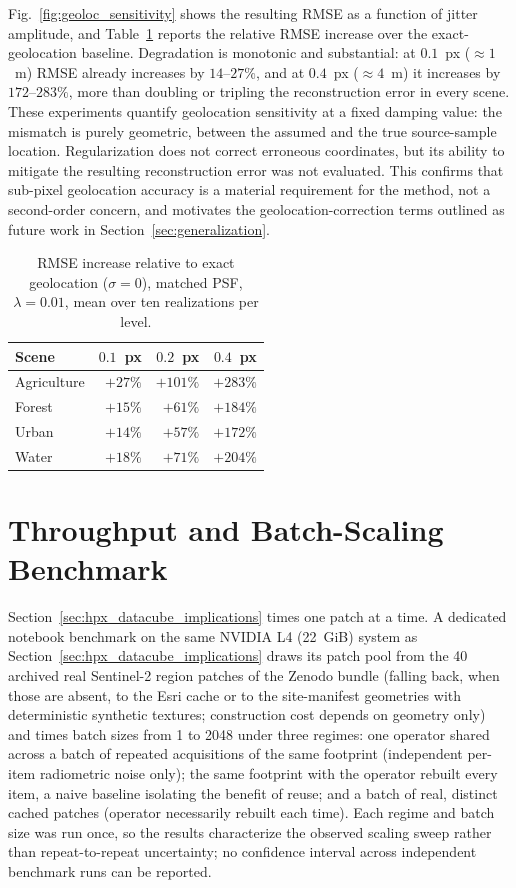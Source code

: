 \documentclass[journal]{IEEEtran}
\newcommand{\psf}{PSF\xspace}
\begin{document}
Fig.~\ref{fig:geoloc_sensitivity} shows the resulting RMSE as a
function of jitter amplitude, and
Table~\ref{tab:geoloc_sensitivity} reports the relative RMSE
increase over the exact-geolocation baseline. Degradation is
monotonic and substantial: at $0.1$~px ($\approx1$~m) RMSE already
increases by $14$--$27\%$, and at $0.4$~px ($\approx4$~m) it
increases by $172$--$283\%$, more than doubling or tripling the
reconstruction error in every scene. These experiments quantify geolocation
sensitivity at a fixed damping value: the mismatch is purely
geometric, between the assumed and the true source-sample
location. Regularization does not correct erroneous coordinates,
but its ability to mitigate the resulting reconstruction error was
not evaluated. This confirms that sub-pixel geolocation accuracy is a
material requirement for the method, not a second-order concern,
and motivates the geolocation-correction terms outlined as future
work in Section~\ref{sec:generalization}.

\begin{table}[t]
\centering
\caption{RMSE increase relative to exact geolocation ($\sigma=0$),
matched \psf, $\lambda=0.01$, mean over ten realizations per level.}
\label{tab:geoloc_sensitivity}
\begin{tabular}{lrrr}
\toprule
Scene & $0.1$~px & $0.2$~px & $0.4$~px \\
\midrule
Agriculture & $+27\%$ & $+101\%$ & $+283\%$ \\
Forest      & $+15\%$ & $+61\%$  & $+184\%$ \\
Urban       & $+14\%$ & $+57\%$  & $+172\%$ \\
Water       & $+18\%$ & $+71\%$  & $+204\%$ \\
\bottomrule
\end{tabular}
\end{table}

\section{Throughput and Batch-Scaling Benchmark}
\label{app:throughput_scaling}

Section~\ref{sec:hpx_datacube_implications} times one patch at a time.
A dedicated notebook benchmark on the same NVIDIA L4 (22~GiB)
system as
Section~\ref{sec:hpx_datacube_implications} draws its patch pool
from the 40 archived real Sentinel-2 region patches of the Zenodo bundle
(falling back, when those are absent, to the Esri cache or to the
site-manifest geometries with deterministic synthetic textures;
construction cost depends on geometry only) and times
batch sizes from 1 to 2048
under three
regimes: one operator shared across a batch of repeated acquisitions
of the same footprint (independent per-item radiometric noise only);
the same footprint with the operator rebuilt every item, a naive
baseline isolating the benefit of reuse; and a batch of real,
distinct cached patches (operator necessarily rebuilt each time).
Each regime and batch size was run once, so the results characterize
the observed scaling sweep rather than repeat-to-repeat uncertainty;
no confidence interval across independent benchmark runs can be
reported.
\end{document}
